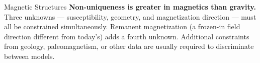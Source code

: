 \begin{activity}{Magnetic Structures}
\textbf{Non-uniqueness is greater in magnetics than gravity.} Three unknowns --- susceptibility, geometry, and magnetization direction --- must all be constrained simultaneously. Remanent magnetization (a frozen-in field direction different from today's) adds a fourth unknown. Additional constraints from geology, paleomagnetism, or other data are usually required to discriminate between models.

\end{activity}